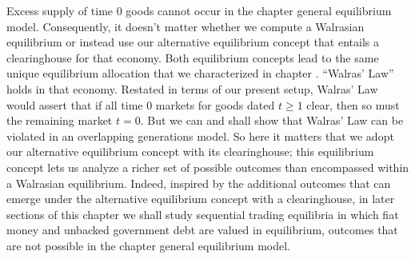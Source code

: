 Excess supply of time $0$
goods cannot occur in the chapter 
general equilibrium model. Consequently, it doesn't  matter
whether we compute a Walrasian equilibrium or instead use our
alternative equilibrium concept that entails a
clearinghouse for that economy. Both equilibrium 
concepts lead to the same unique equilibrium allocation 
that we characterized in chapter .
``Walras' Law'' holds in that economy. Restated in
terms of our present setup, Walras' Law would
assert  that if all time $0$ markets for goods dated 
$t\geq 1$ clear, then  so must the remaining market $t=0$.
But we can and shall  show that  Walras' Law can be 
violated in an overlapping generations model.
So here it matters that we adopt our  alternative
equilibrium concept with its clearinghouse; this equilibrium concept lets us
 analyze a richer set of possible 
outcomes than encompassed within  a Walrasian equilibrium. 
Indeed, inspired by the additional 
outcomes that can  emerge under the alternative 
equilibrium concept with a clearinghouse, in later sections of this chapter we shall 
study sequential trading equilibria 
in which fiat money and unbacked government debt 
are   valued in equilibrium, outcomes that are not possible in the chapter  general 
equilibrium model.







